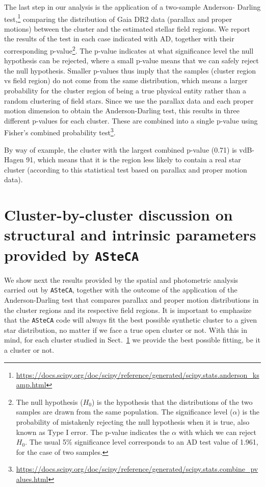 \documentclass{aa}
\begin{document}
The last step in our analysis is the application of a two-sample Anderson-
Darling
test,\footnote{\url{https://docs.scipy.org/doc/scipy/reference/generated/scipy.stats.anderson_ksamp.html}}
comparing the distribution of Gaia DR2 data (parallax and proper motions)
between the cluster and the estimated stellar field regions.
We report the results of the test in each case indicated with AD, together with
their corresponding p-value\footnote{The null hypothesis ($H_{0}$) is the hypothesis
that the distributions of the two samples are drawn from the same population.
The significance level ($\alpha$) is the probability of mistakenly rejecting the
null hypothesis when it is true, also known as Type I error. The p-value
indicates the $\alpha$ with which we can reject $H_{0}$. The usual 5\%
significance level corresponds to an AD test value of 1.961, for the case of two
samples.}.
The p-value indicates at what significance level the null hypothesis
can be rejected, where a small p-value means that we can safely reject the
null hypothesis. Smaller p-values thus imply that the samples (cluster region vs
field region) do not come from the same distribution, which means a larger
probability for the cluster region of being a true physical entity rather than a
random clustering of field stars.
Since we use the parallax data and each proper motion dimension to obtain the
Anderson-Darling test, this results in three different p-values for each
cluster. These are combined into a single p-value using Fisher's combined
probability test\footnote{\url{https://docs.scipy.org/doc/scipy/reference/generated/scipy.stats.combine_pvalues.html}}.

By way of example, the cluster with the largest combined p-value (0.71) is
vdB-Hagen 91, which means that it is the region less likely to contain a real
star cluster (according to this statistical test based on parallax and proper
motion data).






\section{Cluster-by-cluster discussion on structural and intrinsic parameters
provided by \texttt{ASteCA}}
\label{sec:cluster_discuss}

We show next the results provided by the spatial and photometric analysis
carried out by \texttt{ASteCA}, together with the outcome of the application of
the Anderson-Darling test that compares parallax and proper motion distributions
in the cluster regions and its respective field regions.
It is important to emphasize that the \texttt{ASteCA} code will always fit the
best possible synthetic cluster to a given star distribution, no matter if we
face a true open cluster or not. With this in mind, for each cluster studied in
Sect.~\ref{sec:cluster_discuss} we provide the best possible fitting, be it a
cluster or not.
\end{document}
